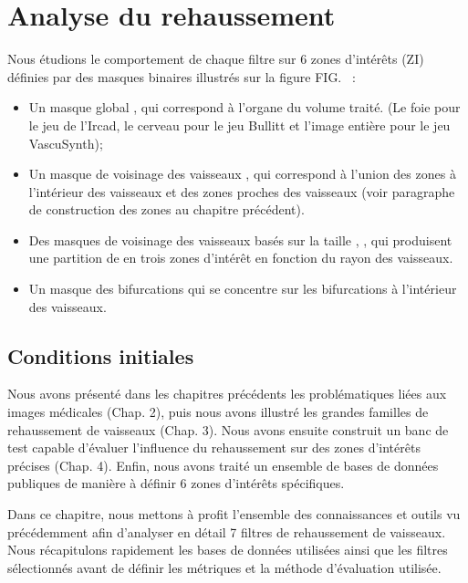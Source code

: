 \chapter{Analyse du rehaussement}

Nous étudions le comportement de chaque filtre sur 6 zones d'intérêts (ZI) définies par des masques binaires illustrés sur la figure FIG.~\cite{fig:areas_of_interest} :

\begin{itemize}
\item Un masque global \maskglobal, qui correspond à l'organe du volume traité. (Le foie pour le jeu de l'Ircad, le cerveau pour le jeu Bullitt et l'image entière pour le jeu VascuSynth);
\item Un masque de voisinage des vaisseaux \maskvascular, qui correspond à l'union des zones à l'intérieur des vaisseaux et des zones proches des vaisseaux (voir paragraphe de construction des zones au chapitre précédent).
\item Des masques de voisinage des vaisseaux basés sur la taille \maskvesselLarge, \maskvesselMedium, \maskvesselSmall qui produisent une partition de \maskvascular en trois zones d'intérêt en fonction du rayon des vaisseaux.
\item Un masque des bifurcations \maskbif qui se concentre sur les bifurcations à l'intérieur des vaisseaux.
\end{itemize}

\section{Conditions initiales}

Nous avons présenté dans les chapitres précédents les problématiques liées aux images médicales (Chap. 2), puis nous avons illustré les grandes familles de rehaussement de vaisseaux (Chap. 3). Nous avons ensuite construit un banc de test capable d'évaluer l'influence du rehaussement sur des zones d'intérêts précises (Chap. 4). Enfin, nous avons traité un ensemble de bases de données publiques de manière à définir 6 zones d'intérêts spécifiques.

Dans ce chapitre, nous mettons à profit l'ensemble des connaissances et outils vu précédemment afin d'analyser en détail 7 filtres de rehaussement de vaisseaux. Nous récapitulons rapidement les bases de données utilisées ainsi que les filtres sélectionnés avant de définir les métriques et la méthode d'évaluation utilisée.
